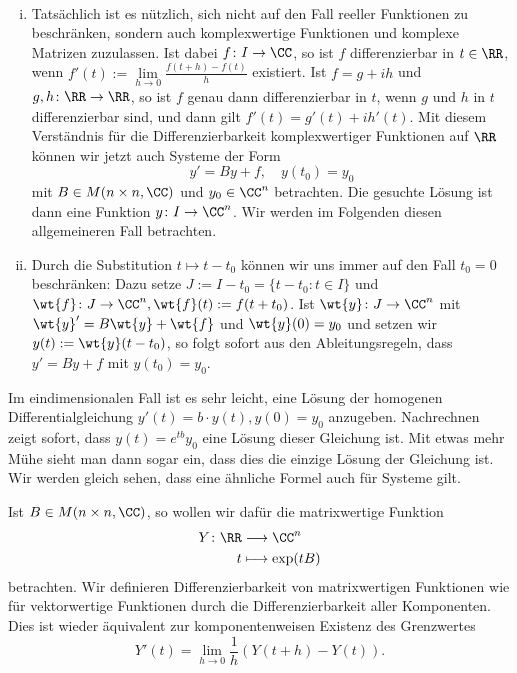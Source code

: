 \begin{bemerkung}
	\label{bem:10.12}
	\mbox{} \\[-1.4cm]
	\begin{enumerate}[(i)]
		\item Tatsächlich ist es nützlich, sich nicht auf den Fall reeller Funktionen zu beschränken, sondern auch komplexwertige Funktionen und komplexe Matrizen zuzulassen.
		Ist dabei $f\colon I \rightarrow \CC$, so ist $f$ differenzierbar in $t \in \RR$, wenn $f'(t) := \lim\limits_{h \rightarrow 0} \frac{f(t+h) - f(t)}{h}$ existiert.
		Ist $f = g + ih$ und $g,h \colon \RR \rightarrow \RR$, so ist $f$ genau dann differenzierbar in $t$, wenn $g$ und $h$ in $t$ differenzierbar sind, und dann gilt $f'(t) = g'(t) + ih'(t)$.
		Mit diesem Verständnis für die Differenzierbarkeit komplexwertiger Funktionen auf $\RR$ können wir jetzt auch Systeme der Form
		\[
			y' = By +f, \quad y(t_0)=y_0
		\]
		mit $B \in M(n \times n,\CC)$ und $y_0 \in \CC^n$ betrachten.
		Die gesuchte Lösung ist dann eine Funktion $y\colon I \rightarrow \CC^n$.
		Wir werden im Folgenden diesen allgemeineren Fall betrachten.
		\item Durch die Substitution $t \mapsto t-t_0$ können wir uns immer auf den Fall $t_0 = 0$ beschränken:
		Dazu setze $J := I-t_0 = \{t-t_0 : t \in I\}$ und $\wt{f} \colon J \rightarrow \CC^n, \wt{f}(t) := f(t+t_0)$.
		Ist $\wt{y} \colon J \rightarrow \CC^n$ mit $\wt{y}' = B \wt{y} + \wt{f}$ und $\wt{y}(0) = y_0$ und setzen wir $y(t) := \wt{y}(t-t_0)$, so folgt sofort aus den Ableitungsregeln, dass $y' = By + f$ mit $y(t_0) = y_0$.
	\end{enumerate}
\end{bemerkung}

Im eindimensionalen Fall ist es sehr leicht, eine Lösung der homogenen Differentialgleichung $y'(t) = b \cdot y(t), y(0) = y_0$ anzugeben.
Nachrechnen zeigt sofort, dass $y(t) = e^{tb} y_0$ eine Lösung dieser Gleichung ist.
Mit etwas mehr Mühe sieht man dann sogar ein, dass dies die einzige Lösung der Gleichung ist.
Wir werden gleich sehen, dass eine ähnliche Formel auch für Systeme gilt.

Ist $B \in M(n \times n,\CC)$, so wollen wir dafür die matrixwertige Funktion
\begin{align*}
	Y\colon \RR &\longrightarrow \CC^{n} \\
	t &\longmapsto \exp(tB)
\end{align*}
betrachten.
Wir definieren Differenzierbarkeit von matrixwertigen Funktionen wie für vektorwertige Funktionen durch die Differenzierbarkeit aller Komponenten.
Dies ist wieder äquivalent zur komponentenweisen Existenz des Grenzwertes
\[
	Y'(t) = \lim\limits_{h \rightarrow 0} \frac{1}{h}(Y(t+h)-Y(t)).
\]

